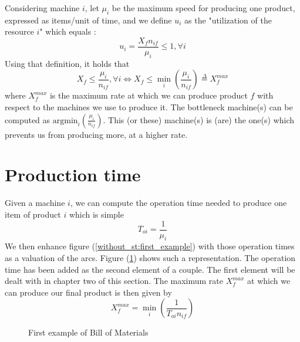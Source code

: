 Considering machine $i$, let $\mu_i$ be the maximum speed for producing one product, expressed as items/unit of time, and we define $u_i$ as the "utilization of the resource $i$" which equals : \[ u_i = \frac{X_fn_{if}}{\mu_i}\le 1, \forall i \] Using that definition, it holds that \[ X_f\le\frac{\mu_i}{n_{if}}, \forall i\Leftrightarrow X_f\le\min_i\left( \frac{\mu_i}{n_{if}} \right) \overset{\Delta}{=} X_f^{max} \] where $X_f^{max}$ is the maximum rate at which we can produce product $f$ with respect to the machines we use to produce it. The bottleneck machine(s) can be computed as $\textrm{argmin}_i\left( \frac{\mu_i}{n_{if}} \right)$. This (or these) machine(s) is (are) the one(s) which prevents us from producing more, at a higher rate. 

\section{Production time}

Given a machine $i$, we can compute the operation time needed to produce one item of product $i$ which is simple \[ T_{oi} = \frac{1}{\mu_i} \] We then enhance figure (\ref{without_st:first_example}) with those operation times as a valuation of the arcs. Figure (\ref{without_st:with_toi}) shows such a representation. The operation time has been added as the second element of a couple. The first element will be dealt with in chapter two of this section. The maximum rate $X_f^{max}$ at which we can produce our final product is then given by \[ X_f^{max} = \min_i\left( \frac{1}{T_{oi}n_{if}} \right) \]

\begin{figure}[h!]
    \centering
    \caption{\label{without_st:with_toi}First example of Bill of Materials}
\end{figure}

